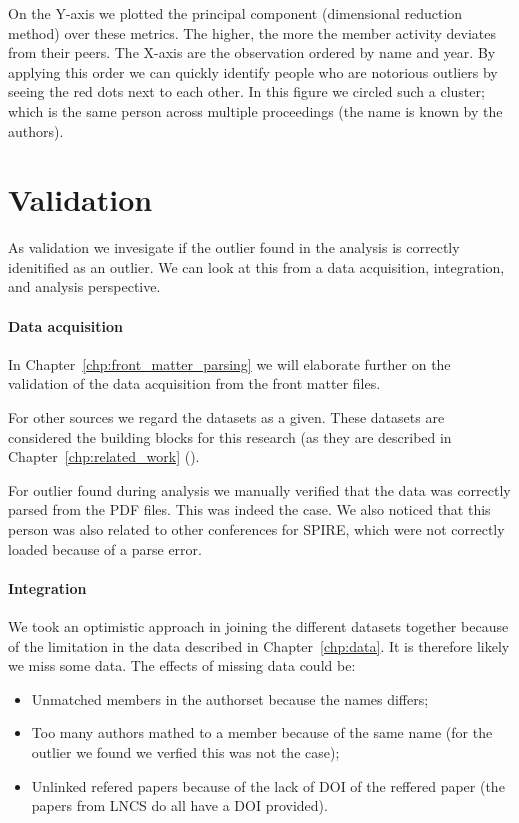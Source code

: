 \documentclass{ou-report}
\newcommand{\outline}[1]{{\color{blue} #1}}
\begin{document}
On the Y-axis we plotted the principal component (dimensional reduction method) 
over these metrics. The higher, the more the member activity deviates from their
peers.
The X-axis are the observation ordered by name and year. By applying this order
we can quickly identify people who are notorious outliers by seeing the red dots
next to each other.
In this figure we circled such a cluster; which is the same person across 
multiple proceedings (the name is known by the authors).


\section{Validation}
As validation we invesigate if the outlier found in the analysis is correctly 
idenitified as an outlier. We can look at this from a data acquisition,
integration, and analysis perspective.
\paragraph{Data acquisition}
In Chapter~\ref{chp:front_matter_parsing} we will elaborate further on the 
validation of the data acquisition from the front matter files.

For other sources we regard the datasets as a given. These datasets are 
considered the building blocks for this research (as they are described in 
Chapter~\ref{chp:related_work} ().

For outlier found during analysis we manually verified that the data was 
correctly parsed from the PDF files. This was
indeed the case. We also noticed that this person was also related to other
conferences
for SPIRE, which were not correctly loaded because of a parse error.

\paragraph{Integration}
We took an optimistic approach in joining the different datasets together 
because of the limitation in the data described in Chapter~\ref{chp:data}. It
is therefore likely we miss some data. The effects of missing data could be:
\begin{itemize}
    \item Unmatched members in the authorset because the names differs;
    \item Too many authors mathed to a member because of the same name (for
    the outlier we found we verfied this was not the case);
    \item Unlinked refered papers because of the lack of DOI of the reffered 
    paper (the papers from LNCS do all have a DOI provided).
\end{itemize}
\end{document}
